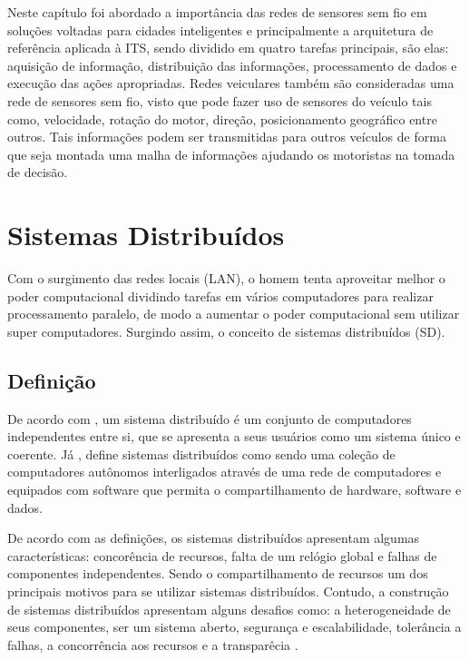 \documentclass[
	12pt,				%
	oneside,			%
	a4paper,			%
	english,			%
	brazil				%
	]{abntex2ppgsi}
\begin{document}
Neste capítulo foi abordado a importância das redes de sensores sem fio em soluções voltadas para cidades inteligentes e principalmente  a arquitetura de referência aplicada à ITS, sendo dividido em quatro tarefas principais, são elas: aquisição de informação, distribuição das informações,  processamento de dados e execução das ações apropriadas. Redes veiculares também são consideradas uma rede de sensores sem fio, visto que pode fazer uso de sensores do veículo tais como, velocidade, rotação do motor, direção, posicionamento geográfico entre outros. Tais informações podem ser transmitidas para outros veículos de forma que seja montada uma malha de informações ajudando os motoristas na tomada de decisão.

\chapter{Sistemas Distribuídos}

Com o surgimento das redes locais (LAN), o homem tenta aproveitar melhor o poder computacional dividindo tarefas em vários computadores para realizar processamento paralelo, de modo a aumentar o poder computacional sem utilizar super computadores. Surgindo assim, o conceito de sistemas distribuídos (SD).

\section{Definição}

De acordo com , um sistema distribuído é um conjunto de computadores independentes entre si, que se apresenta a seus usuários como um sistema único e coerente. Já  , define sistemas distribuídos como sendo uma coleção de computadores autônomos interligados através de uma rede de computadores e equipados com software que permita o compartilhamento de hardware, software e dados.

De acordo com as definições, os sistemas distribuídos apresentam algumas características: concorência de recursos,  falta de um relógio global e falhas de componentes independentes. Sendo o compartilhamento de recursos um dos principais motivos para se utilizar sistemas distribuídos. Contudo, a construção de sistemas distribuídos apresentam alguns desafios como:  a heterogeneidade de seus componentes, ser um sistema aberto, segurança e escalabilidade, tolerância a falhas, a concorrência aos recursos e a transparêcia \cite{coulouris2013sistemas}.
\end{document}
